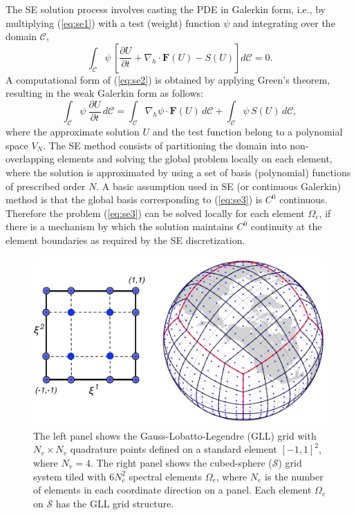 The  SE solution process involves  casting the PDE in Galerkin form, i.e.,  by multiplying  (\ref{eq:se1})  with a test (weight) function
$\psi$  and integrating over the domain $\mathcal{C}$, 
\begin{equation}
 \int_{\mathcal{C}} \psi \,  \left[ \frac{\partial U }{\partial t}  + \nabla_h \cdot \mathbf{F}(U) -  S(U)  \right]  d\mathcal{C}  = 0. \label{eq:se2} 
 \end{equation} 
A computational form of  (\ref{eq:se2})  is obtained by applying Green's theorem,  
resulting in  the weak Galerkin form as follows: 
 \begin{equation}
 \int_{\mathcal{C}} \psi   \ \frac{\partial U }{\partial t} \,   d\mathcal{C}  = 
  \int_{\mathcal{C}}  \nabla_h \psi \cdot \mathbf{F}(U) \,  d\mathcal{C}  + 
       \int_{\mathcal{C}} \psi  \, S(U)  \,   d\mathcal{C}, \label{eq:se3} 
 \end{equation} 
 where the approximate solution $U$ and the test function belong to a polynomial space  $V_{N}$. 
 The SE method consists of  partitioning the domain into non-overlapping elements and solving the global problem 
 locally on each element, where the  solution is approximated by using a set of  basis (polynomial) functions of prescribed 
 order $N$.  A basic assumption used in SE (or continuous Galerkin) method is that the global basis 
 corresponding to (\ref{eq:se3}) is 
 $C^0$ continuous. 
Therefore  the problem (\ref{eq:se3}) can be solved locally for each 
 element $\Omega_e$, if there is a mechanism by which the solution maintains $C^0$ 
 continuity at the element boundaries as required 
 by the SE  discretization.   
  \begin{figure}[h]
\centering
 \includegraphics[scale=0.75]{figs/cs_gll4_2017}
 \caption{The left panel shows the  Gauss-Lobatto-Legendre (GLL)   grid with $ N_v \times  N_v$ quadrature points defined
 on a standard element $[-1,1]^2$, where $N_v=4$. The right panel shows the cubed-sphere ($\mathcal{S}$) grid system tiled with 
 $6 N_e^2 $ spectral elements $\Omega_e$, where $N_e$ is the number of elements  in each coordinate direction
 on a panel. 
 Each element  $\Omega_e$ on $\mathcal{S}$ has the GLL grid structure.  }
 \label{fig:gll4}
\end{figure}
%
 
